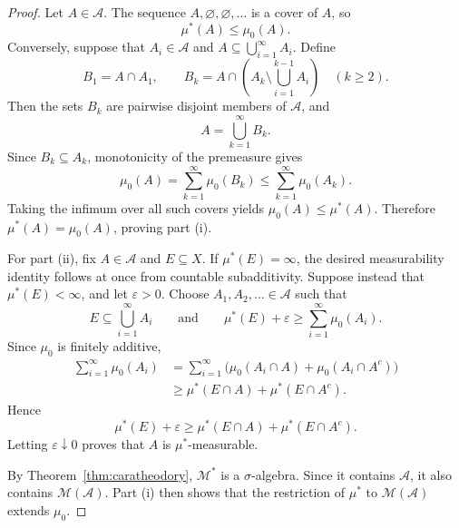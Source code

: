 \begin{proof}
  Let $A\in\mathcal A$. The sequence
  $A,\varnothing,\varnothing,\ldots$ is a cover of $A$, so
  \[
    \mu^*(A)\leq\mu_0(A).
  \]
  Conversely, suppose that $A_i\in\mathcal A$ and
  $A\subseteq\bigcup_{i=1}^{\infty}A_i$. Define
  \[
    B_1=A\cap A_1,
    \qquad
    B_k=A\cap\left(A_k\setminus\bigcup_{i=1}^{k-1}A_i\right)
    \quad(k\geq2).
  \]
  Then the sets $B_k$ are pairwise disjoint members of $\mathcal A$,
  and
  \[
    A=\bigcup_{k=1}^{\infty}B_k.
  \]
  Since $B_k\subseteq A_k$, monotonicity of the premeasure gives
  \[
    \mu_0(A)
    =\sum_{k=1}^{\infty}\mu_0(B_k)
    \leq\sum_{k=1}^{\infty}\mu_0(A_k).
  \]
  Taking the infimum over all such covers yields
  $\mu_0(A)\leq\mu^*(A)$. Therefore $\mu^*(A)=\mu_0(A)$, proving part
  (i).

  For part (ii), fix $A\in\mathcal A$ and $E\subseteq X$. If
  $\mu^*(E)=\infty$, the desired measurability identity follows at once
  from countable subadditivity. Suppose instead that $\mu^*(E)<\infty$,
  and let $\varepsilon>0$. Choose $A_1,A_2,\ldots\in\mathcal A$ such
  that
  \[
    E\subseteq\bigcup_{i=1}^{\infty}A_i
    \qquad\text{and}\qquad
    \mu^*(E)+\varepsilon
    \geq\sum_{i=1}^{\infty}\mu_0(A_i).
  \]
  Since $\mu_0$ is finitely additive,
  \begin{align*}
    \sum_{i=1}^{\infty}\mu_0(A_i)
    &=\sum_{i=1}^{\infty}
      \bigl(\mu_0(A_i\cap A)+\mu_0(A_i\cap A^c)\bigr)\\
    &\geq\mu^*(E\cap A)+\mu^*(E\cap A^c).
  \end{align*}
  Hence
  \[
    \mu^*(E)+\varepsilon
    \geq\mu^*(E\cap A)+\mu^*(E\cap A^c).
  \]
  Letting $\varepsilon\downarrow0$ proves that $A$ is
  $\mu^*$-measurable.

  By Theorem~\ref{thm:caratheodory}, $\mathcal M^*$ is a
  $\sigma$-algebra. Since it contains $\mathcal A$, it also contains
  $\mathcal M(\mathcal A)$. Part (i) then shows that the restriction of
  $\mu^*$ to $\mathcal M(\mathcal A)$ extends $\mu_0$.
\end{proof}
